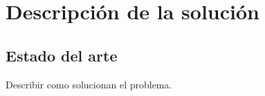 \section{Descripción de la solución}
\begin{comment}
En la presente sección se describe el estado del arte y las características de la solución. Se explicara cual es el propósito de la solución, y posteriormente los alcances y limitaciones establecidas.
\end{comment}

\subsection{Estado del arte}
Describir como solucionan el problema.
\begin{comment}
La más frecuente técnica para inducir cambios rápidos y significativos en la \pam\, ha sido la deflación repentina de los manguitos sobre el muslo \citep{Aaslid1989, Aaslid1991,Lagi1994, Newell1994, Strebel1995, Tiecks1995a}. Con este enfoque, se colocan los manguitos alrededor de ambos muslos y se  genera una presión de \mmhg{20-40} por encima de la presión sistólica durante 2 minutos. Sin embargo, con una autorregulación normal la \cbfv\, vuelve y alcanza su estado basal antes que la \pam. \cite{Aaslid1989} demuestran que la velocidad de recuperación se ve afectada de manera significativa por los niveles de la \pacoo.

La evaluación de la \ca\, mediante el análisis de la función de transferencia está basado en minimizar, en la \ca, el efecto de la oscilación espontánea sobre la \cbfv. El método ha sido extensamente utilizado, por ejemplo, en la investivación del control cardiocasvular, arrítmia sinusal respiratoria y autoregulación renal \citep{Saul1989, Saul1991, Holstein1991}. El análisis espectral, al igual que la transformada rápida de Fourier, transforma la serie en el tiempo de la \bp\, y la \cbfv\, al dominio de la frecuencia. Entonces, la función de transferencia entre las dos señales se calcula como: $$ H(f) = \frac{S_{xy}(f)}{S_{xx}(f)} $$ donde $S_{xx}(f)$ es el autoespectro entre la señal de entrada, \bp, y la de señal de salida, \cbfv \citep{Ainslie2008}. Con la función de potencia relativa asociada (ganancia) y al tiempo (fase) puede ser descrito usando la parte real $H_{R}(f)$ y la parte imaginaria $H_{I}(f)$ de la función de transferencia compleja
\begin{eqnarray}
    \mbox{ganancia : } |H(f)| &=& \sqrt{|H_{R}(f)|^2 + |H_{I}(f)|^2}\\
    \mbox{fase : } \Phi(f) &=& \tan^{-1}\left(\frac{|H_{R}(f)|}{|H_{I}(f)|}\right)
\end{eqnarray}


\end{comment}
